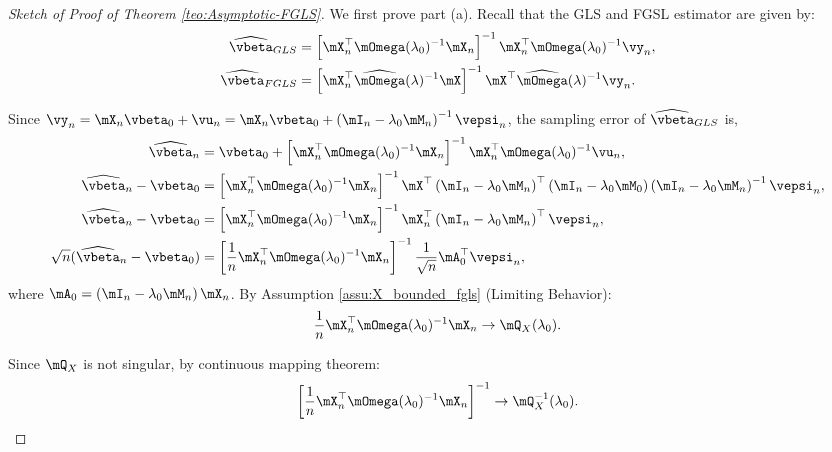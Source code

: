\documentclass[english,12pt]{book}\usepackage[]{graphicx}\usepackage[]{xcolor}
\begin{document}
\begin{proof}[Sketch of Proof of Theorem \ref{teo:Asymptotic-FGLS}]
We first prove part (a). Recall that the GLS and FGSL estimator are given by:
\begin{equation*}
\begin{aligned}
\widehat{\vbeta}_{GLS} & = \left[\mX^\top_n\mOmega(\lambda_0)^{-1}\mX_n\right]^{-1}\mX^\top_n\mOmega(\lambda_0)^{-1}\vy_n,  \\
\widehat{\vbeta}_{FGLS} & = \left[\mX^\top_n\widehat{\mOmega}(\lambda)^{-1}\mX\right]^{-1}\mX^\top\widehat{\mOmega}(\lambda)^{-1}\vy_n.
\end{aligned}
\end{equation*}

Since $\vy_n = \mX_n\vbeta_0 + \vu_n = \mX_n\vbeta_0 + \left(\mI_n-\lambda_0\mM_n\right)^{-1}\vepsi_n$, the sampling error of $\widehat{\vbeta}_{GLS}$ is,
\begin{equation*}
  \begin{aligned}
  \widehat{\vbeta}_n & = \vbeta_0 + \left[\mX^\top_n\mOmega(\lambda_0)^{-1}\mX_n\right]^{-1}\mX^\top_n\mOmega(\lambda_0)^{-1}\vu_n,  \\
  \widehat{\vbeta}_n - \vbeta_0 & =  \left[\mX^\top_n\mOmega(\lambda_0)^{-1}\mX_n\right]^{-1}\mX^\top\left(\mI_n - \lambda_0\mM_n\right)^\top\left(\mI_n - \lambda_0\mM_0\right)\left(\mI_n - \lambda_0\mM_n\right)^{-1}\vepsi_n, \\
  \widehat{\vbeta}_n - \vbeta_0 & =  \left[\mX^\top_n\mOmega(\lambda_0)^{-1}\mX_n\right]^{-1}\mX^\top_n\left(\mI_n - \lambda_0\mM_n\right)^\top\vepsi_n,  \\
  \sqrt{n}(\widehat{\vbeta}_n - \vbeta_0) & =  \left[\frac{1}{n}\mX^\top_n\mOmega(\lambda_0)^{-1}\mX_n\right]^{-1}\frac{1}{\sqrt{n}}\mA^\top_0\vepsi_n, 
  \end{aligned}
\end{equation*}
%
where $\mA_0 = \left(\mI_n - \lambda_0\mM_n\right)\mX_n$. By Assumption \ref{assu:X_bounded_fgls} (Limiting Behavior): 
\begin{equation*}
  \frac{1}{n}\mX^\top_n\mOmega(\lambda_0)^{-1}\mX_n \to \mQ_X(\lambda_0).
\end{equation*}

Since $\mQ_X$ is not singular, by continuous mapping theorem:
\begin{equation*}
  \left[\frac{1}{n}\mX^\top_n\mOmega(\lambda_0)^{-1}\mX_n\right]^{-1} \to \mQ_X^{-1}(\lambda_0).
\end{equation*}


\end{proof}
\end{document}
